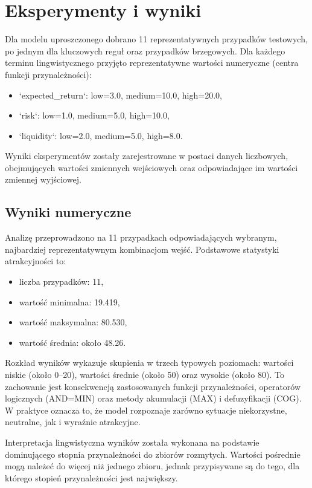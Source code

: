 \documentclass[11pt,a4paper]{article}
\begin{document}
\section{Eksperymenty i wyniki}
Dla modelu uproszczonego dobrano 11 reprezentatywnych przypadków testowych, po jednym dla kluczowych
reguł oraz przypadków brzegowych. Dla każdego terminu lingwistycznego przyjęto reprezentatywne
wartości numeryczne (centra funkcji przynależności):
\begin{itemize}
  \item `expected\_return`: low=3.0, medium=10.0, high=20.0,
  \item `risk`: low=1.0, medium=5.0, high=10.0,
  \item `liquidity`: low=2.0, medium=5.0, high=8.0.
\end{itemize}
Wyniki eksperymentów zostały zarejestrowane w postaci danych liczbowych,
obejmujących wartości zmiennych wejściowych oraz odpowiadające im wartości
zmiennej wyjściowej.

\subsection{Wyniki numeryczne}
Analizę przeprowadzono na 11 przypadkach odpowiadających wybranym, najbardziej reprezentatywnym
kombinacjom wejść. Podstawowe statystyki atrakcyjności to:
\begin{itemize}
  \item liczba przypadków: 11,
  \item wartość minimalna: 19.419,
  \item wartość maksymalna: 80.530,
  \item wartość średnia: około 48.26.
\end{itemize}

Rozkład wyników wykazuje skupienia w trzech typowych poziomach: wartości niskie (około 0--20),
wartości średnie (około 50) oraz wysokie (około 80). To zachowanie jest konsekwencją zastosowanych
funkcji przynależności, operatorów logicznych (AND=MIN) oraz metody akumulacji (MAX) i defuzyfikacji
(COG). W praktyce oznacza to, że model rozpoznaje zarówno sytuacje niekorzystne, neutralne, jak i
wyraźnie atrakcyjne.

Interpretacja lingwistyczna wyników została wykonana na podstawie dominującego
stopnia przynależności do zbiorów rozmytych. Wartości pośrednie mogą należeć do
więcej niż jednego zbioru, jednak przypisywane są do tego, dla którego stopień
przynależności jest największy.
\end{document}
